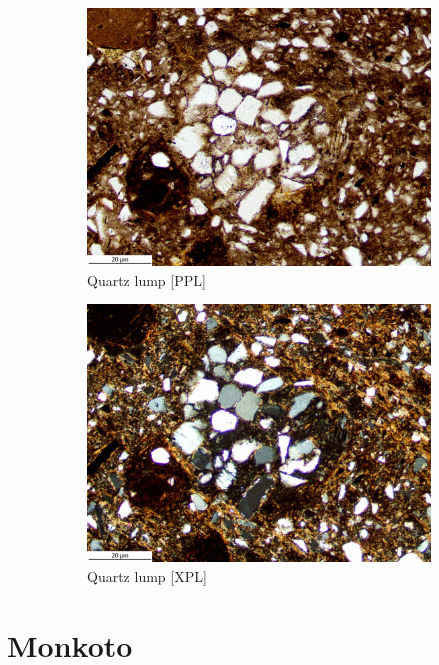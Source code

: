 \documentclass[a4paper]{article}
\begin{document}
\begin{figure}[H]
\begin{subfigure}[t]{.49\textwidth}
		\includegraphics[width=\textwidth]{ThinSections/44-4_10x_PPL.jpg}
		\caption{Quartz lump [PPL]}
	\end{subfigure}\hspace{.5em}\hfill
	\begin{subfigure}[t]{.49\textwidth}
		\includegraphics[width=\textwidth]{ThinSections/44-4_10x_XPL.jpg}
		\caption{Quartz lump [XPL]}
	\end{subfigure}
	\caption{}
	\label{fig:44_snp}
\end{figure}

\newpage\section{Monkoto}
\end{document}
